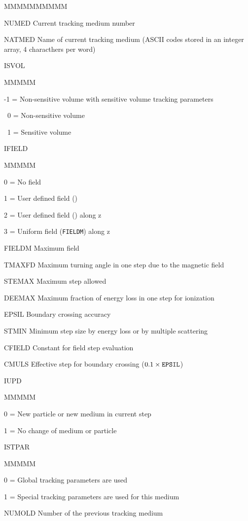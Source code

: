 \begin{DLtt}{MMMMMMMMMM}
\item[NUMED]  Current tracking medium number
\item[NATMED] Name of current tracking medium (ASCII codes stored in an integer
array, 4 characthers per word)
\item[ISVOL]
\begin{DLtt}{MMMMM}
\item[-1 =] Non-sensitive volume with sensitive volume tracking parameters
\item[~0 =] Non-sensitive volume
\item[~1 =] Sensitive volume
\end{DLtt}
\item[IFIELD]
\begin{DLtt}{MMMMM}
\item[0 =] No field
\item[1 =] User defined field ()
\item[2 =] User defined field () along z
\item[3 =] Uniform field ({\tt FIELDM}) along z
\end{DLtt}
\item[FIELDM] Maximum field
\item[TMAXFD] Maximum turning angle in one step due to the magnetic
field
\item[STEMAX] Maximum step allowed
\item[DEEMAX] Maximum fraction of energy loss in one step for ionization
\item[EPSIL] Boundary crossing accuracy
\item[STMIN] Minimum step size by energy loss or by multiple scattering
\item[CFIELD]Constant for field step evaluation
\item[CMULS]Effective step for boundary crossing ($0.1 \times {\tt EPSIL}$)
\item[IUPD]
\begin{DLtt}{MMMMM}
\item[0 =] New particle or new medium in current step
\item[1 =] No change of medium or particle
\end{DLtt}
\item[ISTPAR]
\begin{DLtt}{MMMMM}
\item[0 =] Global tracking parameters are used
\item[1 =] Special tracking parameters are used for this medium
\end{DLtt}
\item[NUMOLD] Number of the previous tracking medium
\end{DLtt}
